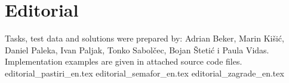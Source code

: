 \documentclass[a4paper]{article}
\date{October 3rd 2020.}
\begin{document}
\section*{Editorial}
Tasks, test data and solutions were prepared by:
Adrian Beker, Marin Kišić,
Daniel Paleka, Ivan Paljak, Tonko Sabolčec, Bojan Štetić i Paula Vidas.
Implementation examples are given in attached source code files.
\clearpage
{editorial_pastiri_en.tex}
\clearpage
{editorial_semafor_en.tex}
\clearpage
{editorial_zagrade_en.tex}
\clearpage
\end{document}
